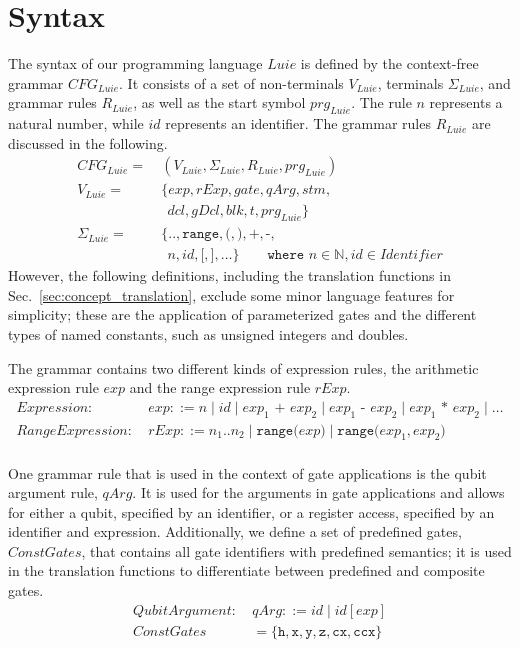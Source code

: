 \section{Syntax}
\label{sec:concept_abstractGrammar}
The syntax of our programming language $Luie$ is defined by the context-free grammar $CFG_{Luie}$. It consists of a set of non-terminals $V_{Luie}$, terminals $\Sigma_{Luie}$, and grammar rules $R_{Luie}$, as well as the start symbol $prg_{Luie}$. The rule $n$ represents a natural number, while $id$ represents an identifier. The grammar rules $R_{Luie}$ are discussed in the following. 
\begin{align*}
    CFG_{Luie} = \ & (V_{Luie}, \Sigma_{Luie}, R_{Luie}, prg_{Luie} )\\ 
    V_{Luie} = \ & \{ exp, rExp, gate,  qArg, stm,\\ 
    & \ \  dcl, gDcl, blk, t, prg_{Luie} \}\\ 
    \Sigma_{Luie} = \ & \{\texttt{..}, \texttt{range}, \texttt{(}, \texttt{)}, \texttt{+}, \texttt{-}, \\
    & \ \  n, id, \texttt{[}, \texttt{]}, \dots \} 
    \quad \quad \texttt{where } n \in \mathbb{N}, id \in Identifier
\end{align*}
However, the following definitions, including the translation functions in Sec.~\ref{sec:concept_translation}, exclude some minor language features for simplicity; these are the application of parameterized gates and the different types of named constants, such as unsigned integers and doubles.

The grammar contains two different kinds of expression rules, the arithmetic expression rule $exp$ and the range expression rule $rExp$.
\begin{align*}
    Expression: \ & exp ::= n \mid id \mid exp_1 \texttt{ + } exp_2 \mid exp_1 \texttt{ - } exp_2 \mid exp_1 \texttt{ * } exp_2 \mid \dots\\
    RangeExpression: \ & rExp ::= n_1 .. n_2 \mid \texttt{range(} exp \texttt{)} \mid \texttt{range(} exp_1, exp_2 \texttt{)}\\
\end{align*}

One grammar rule that is used in the context of gate applications is the qubit argument rule, $qArg$. It is used for the arguments in gate applications and allows for either a qubit, specified by an identifier, or a register access, specified by an identifier and expression. Additionally, we define a set of predefined gates, $ConstGates$, that contains all gate identifiers with predefined semantics; it is used in the translation functions to differentiate between predefined and composite gates.
\begin{align*}
    QubitArgument: \ & qArg ::= id \mid id[exp]\\
    ConstGates &= \{\texttt{h}, \texttt{x}, \texttt{y}, \texttt{z}, \texttt{cx}, \texttt{ccx}\}
\end{align*}

